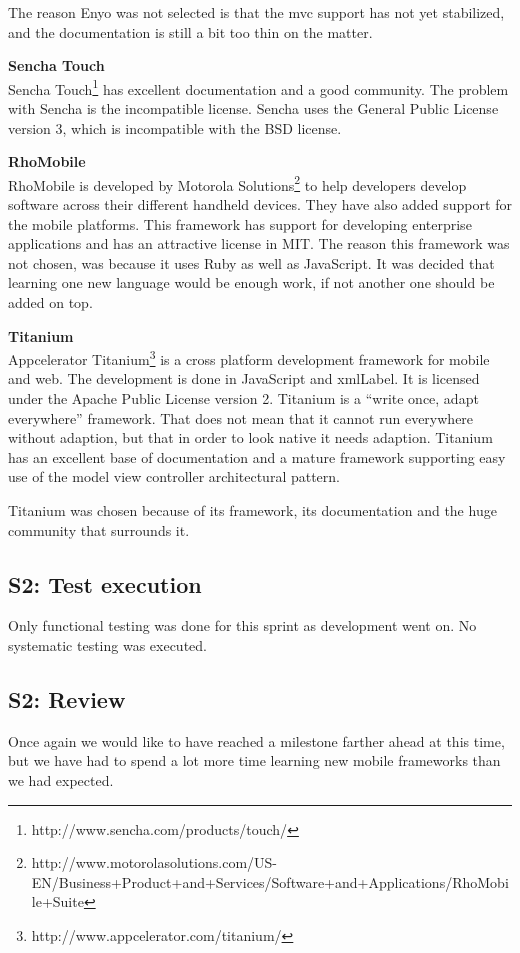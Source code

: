 \documentclass[11pt]{book}
\begin{document}
The reason Enyo was not selected is that the \gls{mvc} support has not yet stabilized, and the documentation is still a bit too thin on the matter.

\textbf{Sencha Touch}\\
Sencha Touch\footnote{http://www.sencha.com/products/touch/} has excellent documentation and a good community. The problem with Sencha is the incompatible license. Sencha uses the General Public License version 3, which is incompatible with the BSD license.\cite{flossLicense}

\textbf{RhoMobile}\\
RhoMobile is developed by Motorola Solutions\footnote{http://www.motorolasolutions.com/US-EN/Business+Product+and+Services/Software+and+Applications/RhoMobile+Suite} to help developers develop software across their different handheld devices. They have also added support for the mobile platforms. This framework has support for developing enterprise applications and has an attractive license in MIT.
The reason this framework was not chosen, was because it uses Ruby as well as JavaScript. It was decided that learning one new language would be enough work, if not another one should be added on top.

\textbf{Titanium}\\
Appcelerator Titanium\footnote{http://www.appcelerator.com/titanium/} is a cross platform development framework for mobile and web. The development is done in JavaScript and \gls{xmlLabel}. It is licensed under the Apache Public License version 2. Titanium is a ``write once, adapt everywhere'' framework\cite{titaniumCrossMobile}. That does not mean that it cannot run everywhere without adaption, but that in order to look native it needs adaption. Titanium has an excellent base of documentation and a mature framework supporting easy use of the model view controller architectural pattern.

Titanium was chosen because of its framework, its documentation and the huge community that surrounds it.


\subsection{S2: Test execution}
Only functional testing was done for this sprint as development went on. No systematic testing was executed.

\subsection{S2: Review}
Once again we would like to have reached a milestone farther ahead at this time, but we have had to spend a lot more time learning new mobile frameworks than we had expected. 
\end{document}
